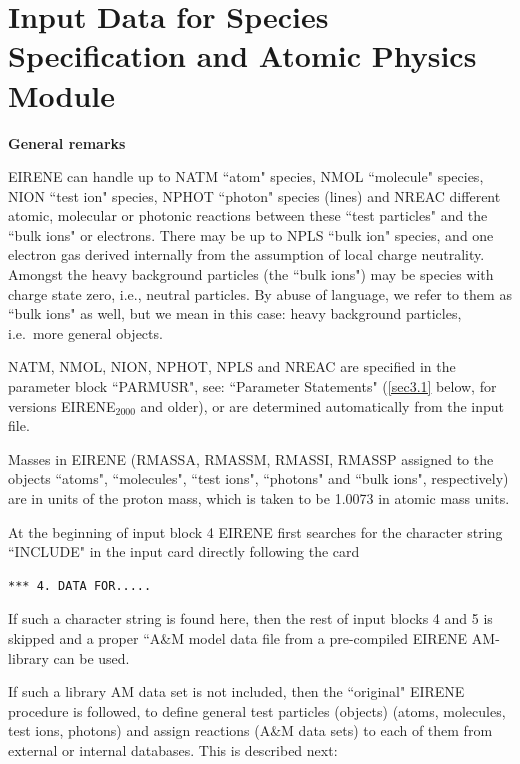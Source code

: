 \section{Input Data for Species Specification and Atomic Physics Module}
\label{sec2.4}

\textbf{General remarks} 

\medskip 

EIRENE can handle up to NATM ``atom" species, NMOL ``molecule" species, NION
``test ion" species, NPHOT ``photon" species (lines) and NREAC different
atomic, molecular or photonic reactions between these ``test particles" and the
``bulk ions" or electrons.
There may be up to NPLS ``bulk ion" species, and one electron gas derived
internally from the assumption of local charge neutrality.
Amongst the heavy background particles (the ``bulk ions") may be species with
charge state zero, i.e., neutral particles.
By abuse of language, we refer to them as ``bulk ions" as well, but we mean in
this case: heavy background particles, i.e.\ more general objects.

NATM, NMOL, NION, NPHOT, NPLS and NREAC are specified in the parameter block
``PARMUSR", see: ``Parameter Statements" (\cref{sec3.1} below, for versions
EIRENE$_{2000}$ and older), or are determined automatically from the input
file.

Masses in EIRENE (RMASSA, RMASSM, RMASSI, RMASSP assigned to the objects
``atoms", ``molecules", ``test ions", ``photons" and ``bulk ions",
respectively) are in units of the proton mass, which is taken to be 1.0073 in
atomic mass units.

\medskip

At the beginning of input block 4 EIRENE first searches for the character
string ``INCLUDE" in the input card directly following the card

\begin{lstlisting}
*** 4. DATA FOR.....
\end{lstlisting} 

If such a character string is found here, then the rest of input blocks 4 and 5
is skipped and a proper ``A\&M model data file from a pre-compiled EIRENE
AM-library can be used.

If such a library AM data set is not included, then the ``original" EIRENE
procedure is followed, to define general test particles (objects) (atoms,
molecules, test ions, photons) and assign reactions (A\&M data sets) to each of
them from external or internal databases.
This is described next:
\bigskip

